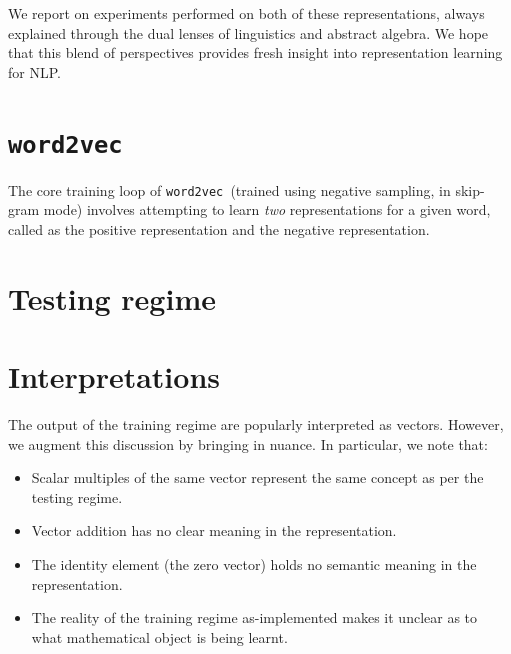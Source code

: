 \documentclass[11pt]{book}
\newcommand{\wtov}{\texttt{word2vec }}
\begin{document}
We report on experiments performed on both of these representations, always
explained through the dual lenses of linguistics and abstract algebra. We hope
that this blend of perspectives provides fresh insight into representation
learning for NLP.


\section{\wtov}

The core training loop of \wtov (trained using negative sampling, in skip-gram
mode) involves attempting to learn \emph{two} representations for a given word,
called as the positive representation and the negative representation.

% 
% 
% 
%     


\section{Testing regime}

\section{Interpretations}



The output of the training regime are popularly interpreted as vectors. However,
we augment this discussion by bringing in nuance. In particular, we note that:
\begin{itemize}
\item Scalar multiples of the same vector represent the same concept as per the testing regime.
\item Vector addition has no clear meaning in the representation.
\item The identity element (the zero vector) holds no semantic meaning in the representation.
\item The reality of the training regime as-implemented makes it unclear as to
      what mathematical object is being learnt.
\end{itemize}
\end{document}
